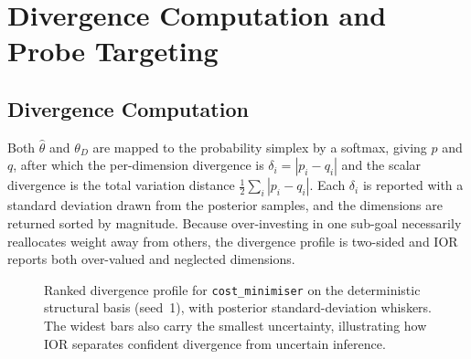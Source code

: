 \section{Divergence Computation and Probe Targeting}
\label{sec:divergence}

\subsection{Divergence Computation}
Both $\hat{\theta}$ and $\theta_D$ are mapped to the probability simplex by a
softmax, giving $p$ and $q$, after which the per-dimension divergence is
$\delta_i = |p_i - q_i|$ and the scalar divergence is the total variation distance
$\tfrac{1}{2}\sum_i |p_i - q_i|$. Each $\delta_i$ is reported with a standard
deviation drawn from the posterior samples, and the dimensions are returned sorted
by magnitude. Because over-investing in one sub-goal
necessarily reallocates weight away from others, the divergence profile is
two-sided and IOR reports both over-valued and neglected dimensions.

\begin{figure}[h]
\centering
{}
\caption{Ranked divergence profile for \texttt{cost_minimiser} on the deterministic
structural basis (seed~1), with posterior standard-deviation whiskers. The widest
bars also carry the smallest uncertainty, illustrating how IOR separates confident
divergence from uncertain inference.}
\label{fig:divbars}
\end{figure}

